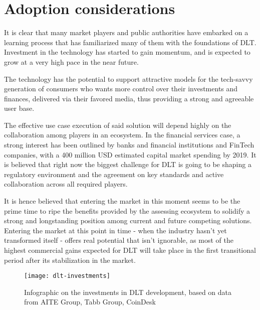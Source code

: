\section{Adoption considerations}

It is clear that many market players and public authorities have embarked on a learning process that has familiarized many of them with the foundations of DLT. Investment in the technology has started to gain momentum, and is expected to grow at a very high pace in the near future.

The technology has the potential to support attractive models for the tech-savvy generation of consumers who wants more control over their investments and finances, delivered via their favored media, thus providing a strong and agreeable user base.

The effective use case execution of said solution will depend highly on the collaboration among players in an ecosystem. In the financial services case, a strong interest has been outlined by banks and financial institutions and FinTech companies, with a 400 million USD estimated capital market spending by 2019. 
It is believed that right now the biggest challenge for DLT is going to be shaping a regulatory environment and the agreement on key standards and active collaboration across all required players.

It is hence believed that entering the market in this moment seems to be the prime time to ripe the benefits provided by the assessing ecosystem to solidify a strong and longstanding position among current and future competing solutions. Entering the market at this point in time - when the industry hasn't yet transformed itself - offers real potential that isn't ignorable, as most of the highest commercial gains expected for DLT will take place in the first transitional period after its stabilization in the market.

\begin{figure}[h]
    \centering
    \texttt{[image: dlt-investments]}
    \caption{
        Infographic on the investments in DLT development,  based on data from AITE Group, Tabb Group, CoinDesk}
\end{figure}